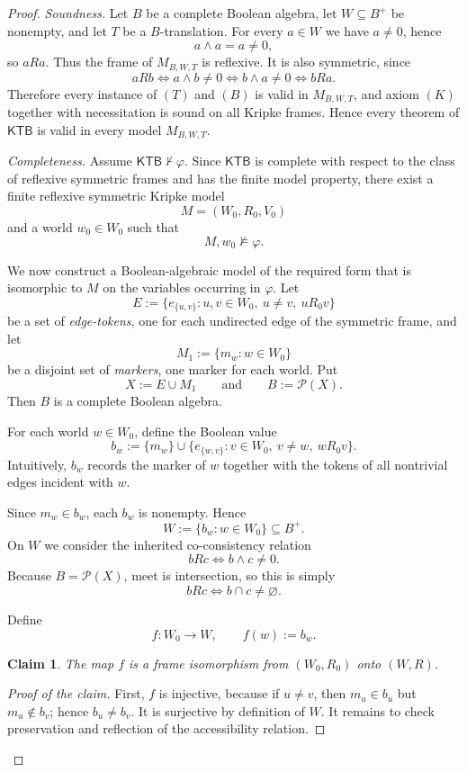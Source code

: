 \documentclass[11pt]{amsart}
\theoremstyle{definition}
\theoremstyle{plain}
\newtheorem{claim}[definition]{Claim}
\newcommand{\Pow}{\mathcal P}
\newcommand{\KTB}{\mathsf{KTB}}
\begin{document}
\begin{proof}
\emph{Soundness.}
Let $B$ be a complete Boolean algebra, let $W\subseteq B^+$ be nonempty, and let $T$ be a
$B$-translation. For every $a\in W$ we have $a\neq 0$, hence
\[
a\wedge a=a\neq 0,
\]
so $aRa$. Thus the frame of $M_{B,W,T}$ is reflexive. It is also symmetric, since
\[
aRb \iff a\wedge b\neq 0 \iff b\wedge a\neq 0 \iff bRa.
\]
Therefore every instance of $(T)$ and $(B)$ is valid in $M_{B,W,T}$, and axiom $(K)$ together
with necessitation is sound on all Kripke frames. Hence every theorem of $\KTB$ is valid
in every model $M_{B,W,T}$.

\medskip
\noindent\emph{Completeness.}
Assume $\KTB\nvdash\varphi$. Since $\KTB$ is complete with respect to the class of
reflexive symmetric frames and has the finite model property, there exist a finite reflexive
symmetric Kripke model
\[
M=(W_0,R_0,V_0)
\]
and a world $w_0\in W_0$ such that
\[
M,w_0\not\models\varphi.
\]

We now construct a Boolean-algebraic model of the required form that is isomorphic to $M$ on the
variables occurring in $\varphi$.
Let
\[
E:=\{e_{\{u,v\}}:u,v\in W_0,\ u\neq v,\ uR_0v\}
\]
be a set of \emph{edge-tokens}, one for each undirected edge of the symmetric frame, and let
\[
M_1:=\{m_w:w\in W_0\}
\]
be a disjoint set of \emph{markers}, one marker for each world. Put
\[
X:=E\cup M_1
\qquad\text{and}\qquad
B:=\Pow(X).
\]
Then $B$ is a complete Boolean algebra.

For each world $w\in W_0$, define the Boolean value
\[
b_w:=\{m_w\}\cup\{e_{\{w,v\}}:v\in W_0,\ v\neq w,\ wR_0v\}.
\]
Intuitively, $b_w$ records the marker of $w$ together with the tokens of all nontrivial edges
incident with $w$.

Since $m_w\in b_w$, each $b_w$ is nonempty. Hence
\[
W:=\{b_w:w\in W_0\}\subseteq B^+.
\]
On $W$ we consider the inherited co-consistency relation
\[
bRc \iff b\wedge c\neq 0.
\]
Because $B=\Pow(X)$, meet is intersection, so this is simply
\[
bRc \iff b\cap c\neq\varnothing.
\]

Define
\[
f:W_0\to W,\qquad f(w):=b_w.
\]

\begin{claim}
The map $f$ is a frame isomorphism from $(W_0,R_0)$ onto $(W,R)$.
\end{claim}

\begin{proof}[Proof of the claim]
First, $f$ is injective, because if $u\neq v$, then $m_u\in b_u$ but $m_u\notin b_v$; hence
$b_u\neq b_v$. It is surjective by definition of $W$.
It remains to check preservation and reflection of the accessibility relation.



\end{proof}
\end{proof}
\end{document}
